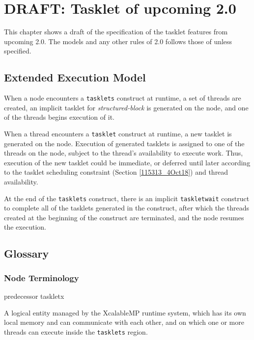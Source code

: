 \chapter{DRAFT: Tasklet of upcoming {\XMP} 2.0}
\label{183724_5Nov18}

This chapter shows a draft of the specification of the tasklet
features from upcoming {\XMP} 2.0.
%
The models and any other rules of {\XMP} 2.0 follows those of {\XMP}
unless specified.

\section{{\XMP} Extended Execution Model}

When a node encounters a \verb|tasklets| construct at runtime, a set of
threads are created, an
implicit tasklet for {\it structured-block} is generated on the
node, and one of the threads begins execution of it.

When a thread encounters a \verb|tasklet| construct at runtime, a new
tasklet is generated on the node. Execution of generated
tasklets is assigned to one of the threads on the node, subject to the
thread's availability to execute work. Thus, execution of the new
tasklet could be immediate, or deferred until later according to the
tasklet scheduling constraint (Section \ref{115313_4Oct18}) and thread
availability.

At the end of the \verb|tasklets| construct, there is an implicit
\verb|taskletwait| construct to complete all of the tasklets generated
in the construct, after which the threads created at the beginning of the
construct are terminated, and the node resumes the execution.


\section{Glossary}\label{sec:tasklet-glossary}

\subsection{Node Terminology}

\begin{namelist}{predecessor taskletx}


  A logical entity managed by the XcalableMP runtime system, which has
  its own local memory and can communicate with each other, and on which
  one or more threads can execute inside the \verb|tasklets| region.

\end{namelist}

